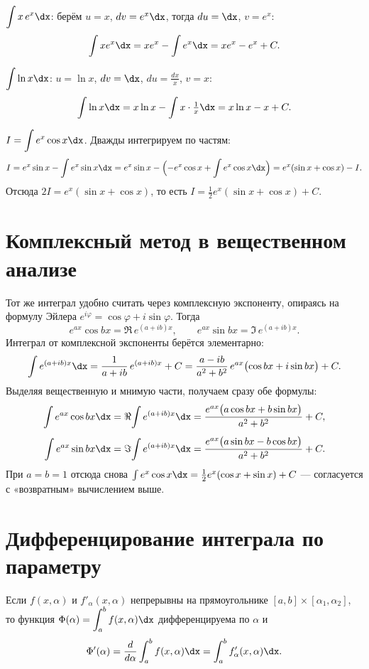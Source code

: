 \begin{example}
$\displaystyle\int x\,e^{x}\dx$: берём $u=x$, $dv=e^x\dx$, тогда $du=\dx$, $v=e^x$:
\[
  \int x e^{x}\dx=xe^{x}-\int e^{x}\dx=xe^{x}-e^{x}+C.
\]
\end{example}

\begin{example}
$\displaystyle\int\ln x\dx$: $u=\ln x$, $dv=\dx$, $du=\tfrac{dx}{x}$, $v=x$:
\[
  \int\ln x\dx=x\ln x-\int x\cdot\tfrac1x\dx=x\ln x-x+C.
\]
\end{example}

\begin{example}
$\displaystyle I=\int e^{x}\cos x\dx$. Дважды интегрируем по частям:
\[
  I=e^{x}\sin x-\int e^{x}\sin x\dx
   =e^{x}\sin x-\Bigl(-e^{x}\cos x+\int e^{x}\cos x\dx\Bigr)
   =e^{x}(\sin x+\cos x)-I.
\]
Отсюда $2I=e^{x}(\sin x+\cos x)$, то есть $I=\tfrac12 e^{x}(\sin x+\cos x)+C$.
\end{example}

\section{Комплексный метод в вещественном анализе}

Тот же интеграл удобно считать через комплексную экспоненту, опираясь на формулу Эйлера
$e^{i\varphi}=\cos\varphi+i\sin\varphi$. Тогда
\[
  e^{ax}\cos bx=\Re\,e^{(a+ib)x},\qquad e^{ax}\sin bx=\Im\,e^{(a+ib)x}.
\]
Интеграл от комплексной экспоненты берётся элементарно:
\[
  \int e^{(a+ib)x}\dx=\frac{1}{a+ib}\,e^{(a+ib)x}+C
   =\frac{a-ib}{a^2+b^2}\,e^{ax}\bigl(\cos bx+i\sin bx\bigr)+C.
\]
Выделяя вещественную и мнимую части, получаем сразу обе формулы:
\begin{align*}
  \int e^{ax}\cos bx\dx &= \Re\!\int e^{(a+ib)x}\dx
     =\frac{e^{ax}\bigl(a\cos bx+b\sin bx\bigr)}{a^2+b^2}+C,\\[4pt]
  \int e^{ax}\sin bx\dx &= \Im\!\int e^{(a+ib)x}\dx
     =\frac{e^{ax}\bigl(a\sin bx-b\cos bx\bigr)}{a^2+b^2}+C.
\end{align*}
При $a=b=1$ отсюда снова $\int e^{x}\cos x\dx=\tfrac12 e^{x}(\cos x+\sin x)+C$ — согласуется с
«возвратным» вычислением выше.

\section{Дифференцирование интеграла по параметру}

\begin{theorem}
Если $f(x,\alpha)$ и $f'_{\alpha}(x,\alpha)$ непрерывны на прямоугольнике
$[a,b]\times[\alpha_1,\alpha_2]$, то функция $\Phi(\alpha)=\displaystyle\int_a^b f(x,\alpha)\dx$
дифференцируема по $\alpha$ и
\[
  \Phi'(\alpha)=\frac{d}{d\alpha}\int_a^b f(x,\alpha)\dx=\int_a^b f'_{\alpha}(x,\alpha)\dx .
\]
\end{theorem}

